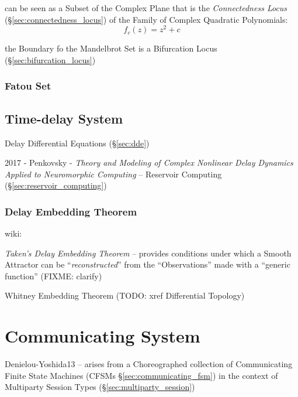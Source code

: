 can be seen as a Subset of the Complex Plane that is the \emph{Connectedness
  Locus} (\S\ref{sec:connectedness_locus}) of the Family of Complex Quadratic
Polynomials:
\[
  f_c(z) = z^2 + c
\]

the Boundary fo the Mandelbrot Set is a Bifurcation Locus
(\S\ref{sec:bifurcation_locus})



\subsubsection{Fatou Set}\label{sec:fatou_set}



\subsection{Time-delay System}\label{sec:time_delay_system}

Delay Differential Equations (\S\ref{sec:dde})

2017 - Penkovsky - \emph{Theory and Modeling of Complex Nonlinear Delay Dynamics
  Applied to Neuromorphic Computing} -- Reservoir Computing
(\S\ref{sec:reservoir_computing})



\subsubsection{Delay Embedding Theorem}\label{sec:delay_embedding}

wiki:

\emph{Taken's Delay Embedding Theorem} -- provides conditions under which a
Smooth Attractor can be ``\emph{reconstructed}'' from the ``Observations'' made
with a ``generic function'' (FIXME: clarify)

Whitney Embedding Theorem (TODO: xref Differential Topology)



\section{Communicating System}\label{sec:communicating_system}

Denielou-Yoshida13 -- arises from a Choreographed collection of
Communicating Finite State Machines (CFSMs
\S\ref{sec:communicating_fsm}) in the context of Multiparty Session
Types (\S\ref{sec:multiparty_session})

